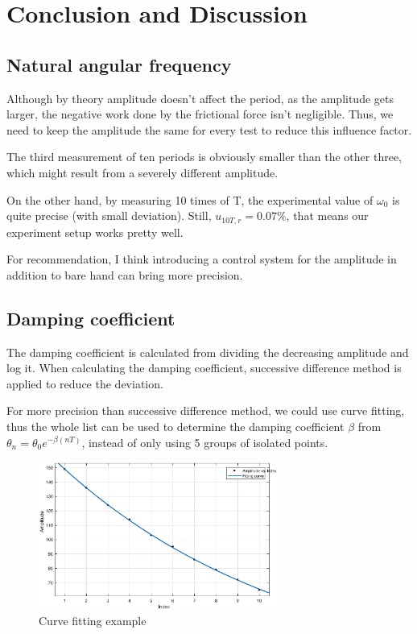 \section{Conclusion and Discussion}

\subsection{Natural angular frequency}

Although by theory amplitude doesn't affect the period, as the amplitude gets
larger, the negative work done by the frictional force isn't negligible.  
Thus, we need to keep the amplitude the same for every test to reduce this
influence factor.

The third measurement of ten periods is obviously smaller than the other three,
which might result from a severely different amplitude.

On the other hand, by measuring 10 times of T, the experimental value of
$\omega_0$ is quite precise (with small deviation).
Still, $u_{10T,r}=0.07\%$, that means our experiment setup works pretty well.

For recommendation, I think introducing a control system for the amplitude in
addition to bare hand can bring more precision.



\subsection{Damping coefficient}

The damping coefficient is calculated from dividing the decreasing
amplitude and log it.
When calculating the damping coefficient, successive difference method is applied
to reduce the deviation. 

For more precision than successive difference method, we could use curve fitting,
thus the whole list can be used to determine the damping coefficient $\beta$
from $\theta_n=\theta_0e^{-\beta (nT)}$, instead of only using 5 groups of
isolated points. 

\begin{figure}[H]
\centering
\includegraphics[width=0.7\textwidth]{matlab/p3}
\caption{Curve fitting example}
\end{figure}

